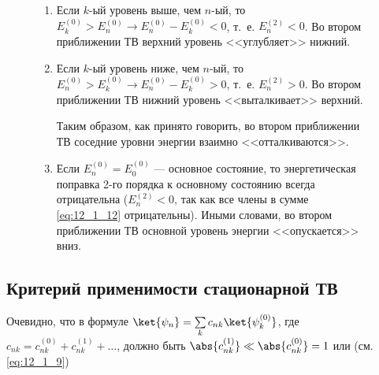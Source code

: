 \begin{figure}[h!]
\begin{minipage}[с]{1cm}
\centering
{}
\end{minipage}
\begin{minipage}[c]{\linewidth-1cm}
\begin{enumerate}
\item Если $k$-ый уровень выше, чем $n$-ый, то ${E_k^{(0)} > E_n^{(0)} \to E_n^{(0)} - E_k^{(0)} < 0}$, т.~е. ${E_n^{(2)} < 0}$. Во втором приближении ТВ верхний уровень <<углубляет>> нижний.

\item Если $k$-ый уровень ниже, чем $n$-ый, то ${E_n^{(0)} > E_k^{(0)} \to E_n^{(0)} - E_k^{(0)} > 0}$, т.~е. ${E_n^{(2)} > 0}$. Во втором приближении ТВ нижний уровень <<выталкивает>> верхний.

Таким образом, как принято говорить, во втором приближении ТВ соседние уровни энергии взаимно <<отталкиваются>>.

\item Если $E_n^{(0)} = E_0^{(0)}$ --- основное состояние, то энергетическая поправка 2-го порядка к основному состоянию всегда отрицательна ($E_n^{(2)} < 0$, так как все члены в сумме \eqref{eq:12_1_12} отрицательны). Иными словами, во втором приближении ТВ основной уровень энергии <<опускается>> вниз.

\end{enumerate}
\end{minipage}
\end{figure}

\subsection{Критерий применимости стационарной ТВ}
 
Очевидно, что в формуле $\ket{\psi_n} = \sum\limits_k c_{nk} \ket{\psi_k^{(0)}}$, где $c_{nk} = c_{nk}^{(0)} + c_{nk}^{(1)} + \dots$, должно быть $\abs{c_{nk}^{(1)}} \ll \abs{c_{nk}^{(0)}} = 1$ или (см. \eqref{eq:12_1_9})

